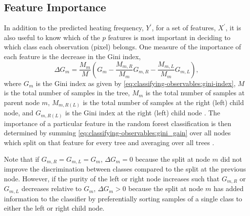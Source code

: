 \subsection{Feature Importance}\label{sec:classifying-observables:feature-importance}

In addition to the predicted heating frequency, $Y^\prime$, for a set of features, $X^\prime$, it is also useful to know which of the $p$ features is most important in deciding to which class each observation (pixel) belongs. One measure of the importance of each feature is the decrease in the Gini index,
\begin{equation}\label{eq:classifying-observables:gini_gain}
    \Delta G_m = \frac{M_m}{M}\left( G_m - \frac{M_{m,R}}{M_m}G_{m,R} - \frac{M_{m,L}}{M_m}G_{m,L} \right),
\end{equation}
where $G_m$ is the Gini index as given by \autoref{eq:classifying-observables:gini-index}, $M$ is the total number of samples in the tree, $M_m$ is the total number of samples at parent node $m$, $M_{m,R(L)}$ is the total number of samples at the right (left) child node, and $G_{m,R(L)}$ is the Gini index at the right (left) child node \citep{sandri_bias_2008}. The importance of a particular feature in the random forest classification is then determined by summing \autoref{eq:classifying-observables:gini_gain} over all nodes which split on that feature for every tree and averaging over all trees \citep{breiman_classification_1984}.

Note that if $G_{m,R}=G_{m,L}=G_m$, $\Delta G_m=0$ because the split at node $m$ did not improve the discrimination between classes compared to the split at the previous node. However, if the purity of the left or right node increases such that $G_{m,R}$ or $G_{m,L}$ decreases relative to $G_m$, $\Delta G_m > 0$ because the split at node $m$ has added information to the classifier by preferentially sorting samples of a single class to either the left or right child node.

